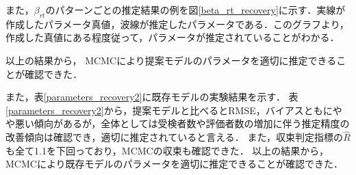 \documentclass[a4paper,11pt,oneside,openany]{jsbook}
\begin{document}
また，$\beta_{rt}$のパターンごとの推定結果の例を図\ref{beta_rt_recovery}に示す．実線が作成したパラメータ真値，波線が推定したパラメータである．このグラフより，作成した真値にある程度従って，パラメータが推定されていることがわかる．

以上の結果から， MCMCにより提案モデルのパラメータを適切に推定できることが確認できた．


また，表\ref{parameters_recovery2}に既存モデルの実験結果を示す．
表\ref{parameters_recovery2}から，提案モデルと比べるとRMSE，バイアスともにやや悪い傾向があるが，全体としては受検者数や評価者数の増加に伴う推定精度の改善傾向は確認でき，適切に推定されていると言える．
また，収束判定指標の$\hat{R} $\cite{RhatRubin,RhatCarlin}も全て1.1を下回っており，MCMCの収束も確認できた．
以上の結果から，MCMCにより既存モデルのパラメータを適切に推定できることが確認できた．
\end{document}
